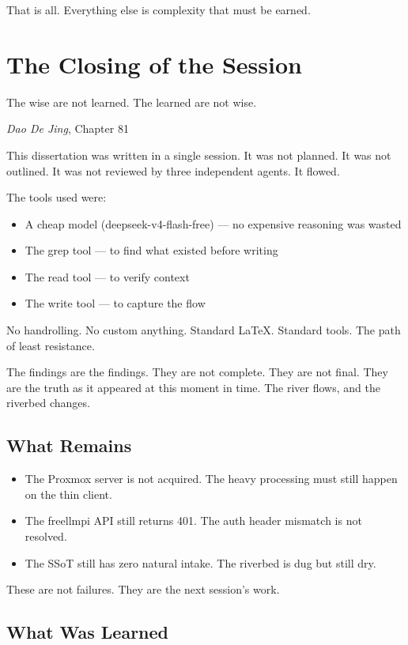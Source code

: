 \documentclass[12pt,a4paper,oneside]{book}
\begin{document}
That is all. Everything else is complexity that must be earned.

\chapter{The Closing of the Session}

\epigraph{The wise are not learned. The learned are not wise.}{\textit{Dao De Jing}, Chapter 81}

This dissertation was written in a single session. It was not planned. It was not outlined. It was not reviewed by three independent agents. It flowed.

The tools used were:
\begin{itemize}
  \item A cheap model (deepseek-v4-flash-free) --- no expensive reasoning was wasted
  \item The grep tool --- to find what existed before writing
  \item The read tool --- to verify context
  \item The write tool --- to capture the flow
\end{itemize}

No handrolling. No custom anything. Standard LaTeX. Standard tools. The path of least resistance.

The findings are the findings. They are not complete. They are not final. They are the truth as it appeared at this moment in time. The river flows, and the riverbed changes.

\section*{What Remains}

\begin{itemize}
  \item The Proxmox server is not acquired. The heavy processing must still happen on the thin client.
  \item The freellmpi API still returns 401. The auth header mismatch is not resolved.
  \item The SSoT still has zero natural intake. The riverbed is dug but still dry.
\end{itemize}

These are not failures. They are the next session's work.

\section*{What Was Learned}
\end{document}
